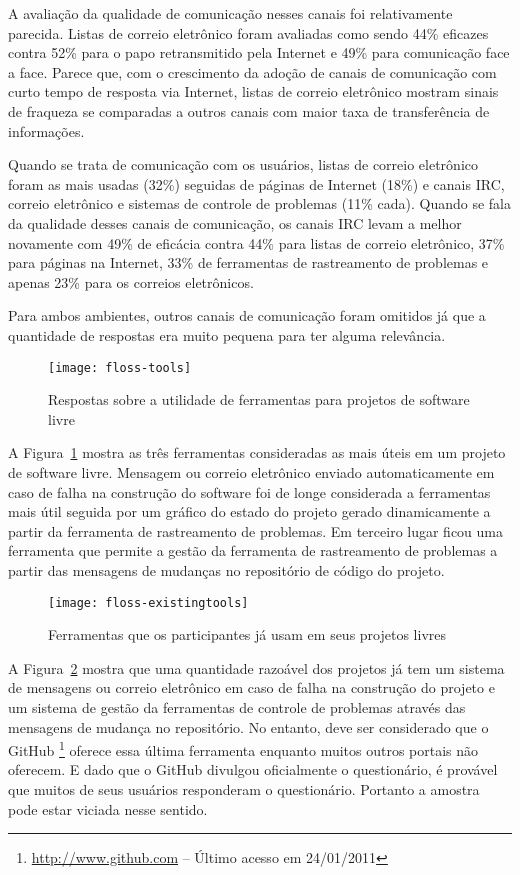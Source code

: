 A avaliação da qualidade de comunicação nesses canais foi
relativamente parecida. Listas de correio eletrônico foram avaliadas
como sendo 44\% eficazes contra 52\% para o papo retransmitido pela
Internet e 49\% para comunicação face a face. Parece que, com o
crescimento da adoção de canais de comunicação com curto tempo de
resposta via Internet, listas de correio eletrônico mostram sinais de
fraqueza se comparadas a outros canais com maior taxa de transferência
de informações.

Quando se trata de comunicação com os usuários, listas de correio
eletrônico foram as mais usadas (32\%) seguidas de páginas de Internet
(18\%) e canais IRC, correio eletrônico e sistemas de controle de
problemas (11\% cada). Quando se fala da qualidade desses canais de
comunicação, os canais IRC levam a melhor novamente com 49\% de
eficácia contra 44\% para listas de correio eletrônico, 37\% para
páginas na Internet, 33\% de ferramentas de rastreamento de problemas
e apenas 23\% para os correios eletrônicos.

Para ambos ambientes, outros canais de comunicação foram omitidos já
que a quantidade de respostas era muito pequena para ter alguma
relevância.

\begin{figure}
  \centering
  \texttt{[image: floss-tools]}
  \caption{Respostas sobre a utilidade de ferramentas para projetos de
    software livre}
  \label{fig:floss-tools}
\end{figure}

A Figura~\ref{fig:floss-tools} mostra as três ferramentas consideradas
as mais úteis em um projeto de software livre. Mensagem ou correio
eletrônico enviado automaticamente em caso de falha na construção do
software foi de longe considerada a ferramentas mais útil seguida por
um gráfico do estado do projeto gerado dinamicamente a partir da
ferramenta de rastreamento de problemas. Em terceiro lugar ficou uma
ferramenta que permite a gestão da ferramenta de rastreamento de
problemas a partir das mensagens de mudanças no repositório de código
do projeto.

\begin{figure}
  \centering
  \texttt{[image: floss-existingtools]}
  \caption{Ferramentas que os participantes já usam em seus projetos
    livres}
  \label{fig:floss-existingtools}
\end{figure}

A Figura~\ref{fig:floss-existingtools} mostra que uma quantidade
razoável dos projetos já tem um sistema de mensagens ou correio
eletrônico em caso de falha na construção do projeto e um sistema de
gestão da ferramentas de controle de problemas através das mensagens
de mudança no repositório. No entanto, deve ser considerado que o
GitHub \footnote{\url{http://www.github.com} -- Último acesso em
  24/01/2011} oferece essa última ferramenta enquanto muitos outros
portais não oferecem. E dado que o GitHub divulgou oficialmente o
questionário, é provável que muitos de seus usuários responderam o
questionário. Portanto a amostra pode estar viciada nesse sentido.

